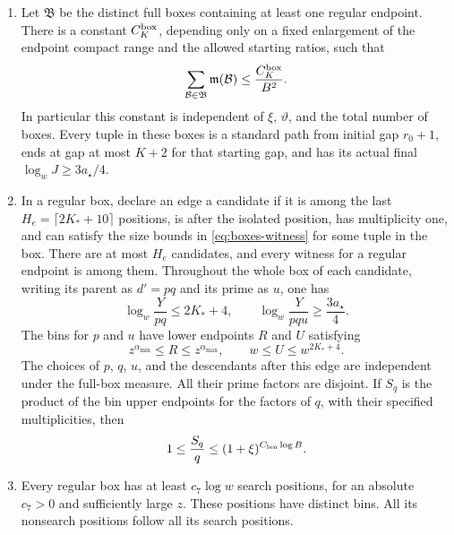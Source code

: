 \begin{proposition}
\begin{enumerate}[label=\textup{(\roman*)}]
\item Let $\mathfrak B$ be the distinct full boxes containing at
least one regular endpoint.  There is a constant $C_K^{\rm box}$,
depending only on a fixed enlargement of the endpoint compact
range and the allowed starting ratios, such that
\begin{equation}\label{eq:boxes-expanded-mass}
 \sum_{\mathcal B\in\mathfrak B}\mathfrak m(\mathcal B)
       \le\frac{C_K^{\rm box}}{B^2}.
\end{equation}
In particular this constant is independent of $\xi$, $\vartheta$, and
the total number of boxes.  Every tuple in these boxes is a
standard path from initial gap $r_0+1$, ends at gap at most $K+2$
for that starting gap, and has its actual final
$\log_wJ\ge3a_\star/4$.

\item In a regular box, declare an edge a candidate if it is
among the last $H_e=\lceil2K_*+10\rceil$ positions, is after the
isolated position, has multiplicity one, and can satisfy the size
bounds in \eqref{eq:boxes-witness} for some tuple in the box.
There are at most $H_e$ candidates, and every witness for a regular
endpoint is among them.  Throughout the whole box of each candidate,
writing its parent as $d'=pq$ and its prime as $u$, one has
\begin{equation}\label{eq:boxes-candidate-slack}
 \log_w\frac{Y}{pq}\le2K_*+4,
 \qquad
 \log_w\frac{Y}{pqu}\ge\frac{3a_\star}{4}.
\end{equation}
The bins for $p$ and $u$ have lower endpoints $R$ and $U$ satisfying
\begin{equation}\label{eq:boxes-prime-ranges}
 z^{\alpha_{\min}}\le R\le z^{\alpha_{\max}},
 \qquad w\le U\le w^{2K_*+4}.
\end{equation}
The choices of $p$, $q$, $u$, and the descendants after this edge
are independent under the full-box measure.  All their prime
factors are disjoint.  If $S_q$ is the product of the bin upper
endpoints for the factors of $q$, with their specified
multiplicities, then
\begin{equation}\label{eq:boxes-sq}
 1\le\frac{S_q}{q}\le(1+\xi)^{C_{\rm len}\log B}.
\end{equation}

\item Every regular box has at least $c_7\log w$ search
positions, for an absolute $c_7>0$ and sufficiently large $z$.
These positions have distinct bins.  All its nonsearch positions
follow all its search positions.
\end{enumerate}
\end{proposition}

